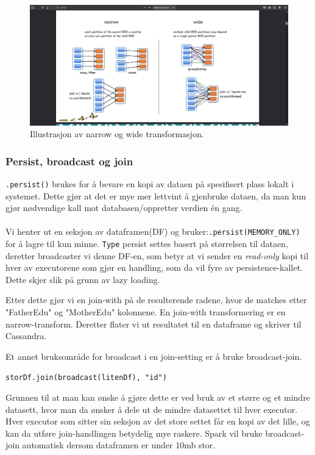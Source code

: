 \FigureCounter
\begin{figure}[H]
    \centering
    \includegraphics[scale=0.3]{images/milepael6/transformActionPic.png}
    Illustrasjon av narrow og wide transformasjon.
\end{figure}

\subsubsection{Persist, broadcast og join}
\lstinline{.persist()} brukes for å bevare en kopi av dataen på spesifisert plass lokalt i systemet. Dette gjør at det er mye mer lettvint å gjenbruke dataen, da man kun gjør nødvendige kall mot databasen/oppretter verdien én gang.


\paragraph{}
 Vi henter ut en seksjon av dataframen(DF)
 og bruker:\lstinline{.persist(MEMORY_ONLY)} for å lagre til kun minne.
 \lstinline{Type} persist settes basert på størrelsen til dataen,
  deretter broadcaster vi denne DF-en, som betyr at vi sender en 
  \textit{read-only} kopi til hver av executorene som gjør en handling, som da vil fyre av persistence-kallet. Dette skjer slik på grunn av lazy loading.

Etter dette gjør vi en join-with på de resulterende radene, hvor de matches etter "FatherEdu" og "MotherEdu" kolonnene. En join-with transformering er en narrow-transform. Deretter flater vi ut resultatet til en dataframe og skriver til Cassandra.

Et annet bruksområde for broadcast i en join-setting er å bruke broadcast-join.

\lstinline {storDf.join(broadcast(litenDf), "id")}

Grunnen til at man kan ønske å gjøre dette er ved bruk av et større og et mindre datasett, hvor man da ønsker å dele ut de mindre datasettet til hver executor. Hver executor som sitter sin seksjon av det store settet får en kopi av det lille, og kan da utføre join-handlingen betydelig mye raskere. Spark vil bruke broadcast-join automatisk dersom dataframen er under 10mb stor.